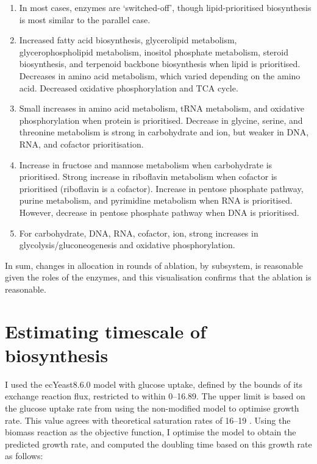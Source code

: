 \begin{enumerate}
  \item In most cases, enzymes are `switched-off', though lipid-prioritised biosynthesis is most similar to the parallel case.
  \item Increased fatty acid biosynthesis, glycerolipid metabolism, glycerophospholipid metabolism, inositol phosphate metabolism, steroid biosynthesis, and terpenoid backbone biosynthesis when lipid is prioritised.
        Decreases in amino acid metabolism, which varied depending on the amino acid.
        Decreased oxidative phosphorylation and TCA cycle.
  \item Small increases in amino acid metabolism, tRNA metabolism, and oxidative phosphorylation when protein is prioritised.
        Decrease in glycine, serine, and threonine metabolism is strong in carbohydrate and ion, but weaker in DNA, RNA, and cofactor prioritisation.
  \item Increase in fructose and mannose metabolism when carbohydrate is prioritised.
        Strong increase in riboflavin metabolism when cofactor is prioritised (riboflavin is a cofactor).
        Increase in pentose phosphate pathway, purine metabolism, and pyrimidine metabolism when RNA is prioritised.
        However, decrease in pentose phosphate pathway when DNA is prioritised.
  \item For carbohydrate, DNA, RNA, cofactor, ion, strong increases in glycolysis/gluconeogenesis and oxidative phosphorylation.
\end{enumerate}

In sum, changes in allocation in rounds of ablation, by subsystem, is reasonable given the roles of the enzymes, and this visualisation confirms that the ablation is reasonable.

\section{Estimating timescale of biosynthesis}
\label{sec:model-timescale}

I used the ecYeast8.6.0 model with glucose uptake, defined by the bounds of its exchange reaction flux, restricted to within \SIrange{0}{16.89}{\mmolgdw}.
The upper limit is based on the glucose uptake rate from using the non-modified model to optimise growth rate.
This value agrees with theoretical saturation rates of \SIrange{16}{19}{\mmolgdw} \parencite{blankTCACycleActivity2004}.
Using the biomass reaction as the objective function, I optimise the model to obtain the predicted growth rate, and computed the doubling time based on this growth rate as follows:

